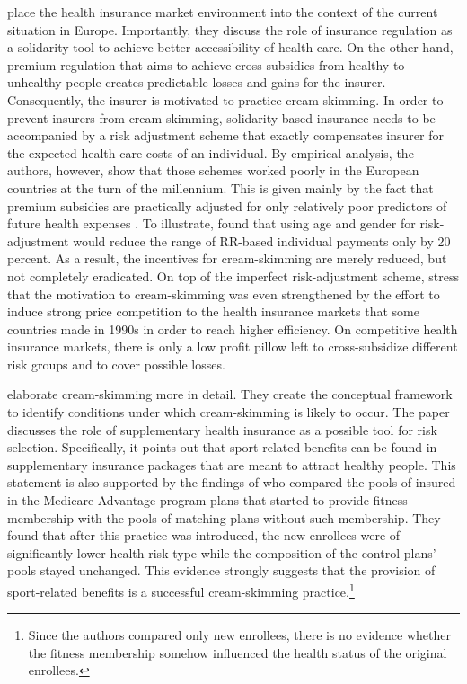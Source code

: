 \documentclass[12pt,english]{article}%
\begin{document}
\citet{deven2003} place the health insurance market environment into the context of the current situation in Europe. Importantly, they discuss the role of insurance regulation as a solidarity tool to achieve better accessibility of health care. On the other hand, premium regulation that aims to achieve cross subsidies from healthy to unhealthy people creates predictable losses and gains for the insurer. Consequently, the insurer is  motivated to practice cream-skimming. In order to prevent insurers from cream-skimming, solidarity-based insurance needs to be accompanied by a risk adjustment scheme that exactly compensates insurer for the expected health care costs of an individual. By empirical analysis, the authors, however, show that those schemes worked poorly in the European countries at the turn of the millennium. This is given mainly by the fact that premium subsidies are practically adjusted for only relatively poor predictors of future health expenses \citep{ellis2000}. To illustrate, \citet{deven1997} found that using age and gender for risk-adjustment would reduce the range of RR-based individual payments only by 20 percent. As a result, the incentives for cream-skimming are merely reduced, but not completely eradicated. On top of the imperfect risk-adjustment scheme, \citet{douven2006} stress that the motivation to cream-skimming was even strengthened by the effort to induce strong price competition to the health insurance markets that some countries made in 1990s in order to reach higher efficiency. On competitive health insurance markets, there is only a low profit pillow left to cross-subsidize different risk groups and to cover possible losses. 

\citet{paolucci2007} elaborate cream-skimming more in detail. They create the conceptual framework to identify conditions under which cream-skimming is likely to occur. The paper discusses the role of supplementary health insurance as a possible tool for risk selection. Specifically, it points out that sport-related benefits can be found in supplementary insurance packages that are meant to attract healthy people. This statement is also supported by the findings of \citet{cooper2012} who compared the pools of insured in the Medicare Advantage program plans that started to provide fitness membership with the pools of matching plans without such membership. They found that after this practice was introduced, the new enrollees were of significantly lower health risk type while the composition of the control plans' pools stayed unchanged. This evidence strongly suggests that the provision of sport-related benefits is a successful cream-skimming practice.\footnote{Since the authors compared only new enrollees, there is no evidence whether the fitness membership somehow influenced the health status of the original enrollees.} 
\end{document}
